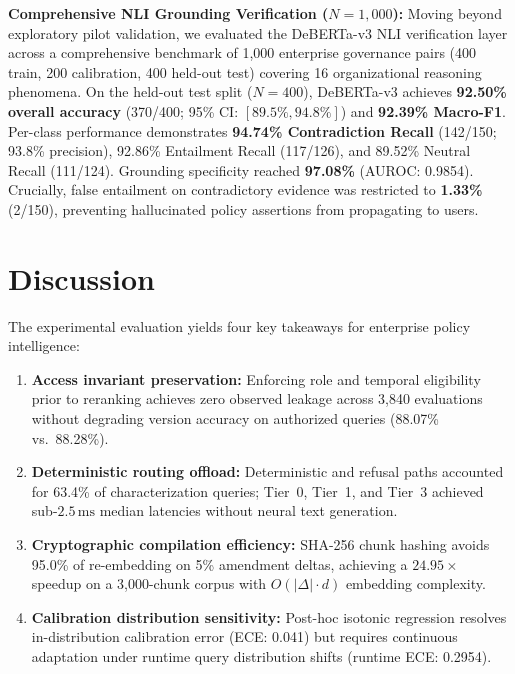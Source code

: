 \documentclass[journal]{IEEEtran}
\newcommand{\ms}{\,\mathrm{ms}}
\begin{document}
\textbf{Comprehensive NLI Grounding Verification ($N=1,000$):} Moving beyond exploratory pilot validation, we evaluated the DeBERTa-v3 NLI verification layer across a comprehensive benchmark of 1,000 enterprise governance pairs (400 train, 200 calibration, 400 held-out test) covering 16 organizational reasoning phenomena. On the held-out test split ($N=400$), DeBERTa-v3 achieves \textbf{92.50\% overall accuracy} (370/400; 95\% CI: $[89.5\%, 94.8\%]$) and \textbf{92.39\% Macro-F1}. Per-class performance demonstrates \textbf{94.74\% Contradiction Recall} (142/150; 93.8\% precision), 92.86\% Entailment Recall (117/126), and 89.52\% Neutral Recall (111/124). Grounding specificity reached \textbf{97.08\%} (AUROC: 0.9854). Crucially, false entailment on contradictory evidence was restricted to \textbf{1.33\%} (2/150), preventing hallucinated policy assertions from propagating to users.

\section{Discussion}

The experimental evaluation yields four key takeaways for enterprise policy intelligence:
\begin{enumerate}
  \setlength{\itemsep}{0pt}\setlength{\parsep}{0pt}\setlength{\topsep}{0.5pt}
  \item \textbf{Access invariant preservation:} Enforcing role and temporal eligibility prior to reranking achieves zero observed leakage across 3,840 evaluations without degrading version accuracy on authorized queries (88.07\% vs.\ 88.28\%).
  \item \textbf{Deterministic routing offload:} Deterministic and refusal paths accounted for 63.4\% of characterization queries; Tier~0, Tier~1, and Tier~3 achieved sub-$2.5\ms$ median latencies without neural text generation.
  \item \textbf{Cryptographic compilation efficiency:} SHA-256 chunk hashing avoids 95.0\% of re-embedding on 5\% amendment deltas, achieving a $24.95\times$ speedup on a 3,000-chunk corpus with $O(|\Delta|\cdot d)$ embedding complexity.
  \item \textbf{Calibration distribution sensitivity:} Post-hoc isotonic regression resolves in-distribution calibration error (ECE: 0.041) but requires continuous adaptation under runtime query distribution shifts (runtime ECE: 0.2954).
\end{enumerate}
\end{document}
